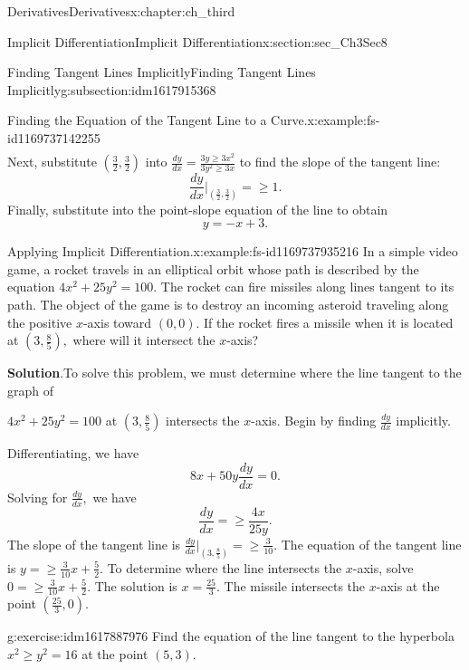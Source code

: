 \documentclass[oneside,10pt,]{book}
\newcommand{\blocktitlefont}{\relax}
\numberwithin{equation}{section}
\begin{document}
\begin{chapterptx}{Derivatives}{}{Derivatives}{}{}{x:chapter:ch_third}
\begin{sectionptx}{Implicit Differentiation}{}{Implicit Differentiation}{}{}{x:section:sec_Ch3Sec8}
\begin{subsectionptx}{Finding Tangent Lines Implicitly}{}{Finding Tangent Lines Implicitly}{}{}{g:subsection:idm1617915368}
\begin{example}{Finding the Equation of the Tangent Line to a Curve.}{x:example:fs-id1169737142255}
\begin{align*}
\end{align*}
Next, substitute \((\frac{3}{2},\frac{3}{2})\) into \(\frac{dy}{dx}=\frac{3y\geq 3x^2}{3y^2\geq 3x}\) to find the slope of the tangent line:%
%
\begin{equation*}
\frac{dy}{dx}|_{(\frac{3}{2},\frac{3}{2})}=\geq 1.
\end{equation*}
Finally, substitute into the point-slope equation of the line to obtain%
%
\begin{equation*}
y=-x+3.
\end{equation*}
\end{example}
\begin{example}{Applying Implicit Differentiation.}{x:example:fs-id1169737935216}%
In a simple video game, a rocket travels in an elliptical orbit whose path is described by the equation \(4x^2+25y^2=100.\) The rocket can fire missiles along lines tangent to its path. The object of the game is to destroy an incoming asteroid traveling along the positive \(x\)-axis toward \((0,0).\) If the rocket fires a missile when it is located at \((3,\frac{8}{5}),\) where will it intersect the \(x\)-axis?%
\par\smallskip%
\noindent\textbf{\blocktitlefont Solution}.\hypertarget{g:solution:idm1617894760}{}\quad{}To solve this problem, we must determine where the line tangent to the graph of%
\par
\(4x^2+25y^2=100\) at \((3,\frac{8}{5})\) intersects the \(x\)-axis. Begin by finding \(\frac{dy}{dx}\) implicitly.%
\par
Differentiating, we have%
%
\begin{equation*}
8x+50y\frac{dy}{dx}=0.
\end{equation*}
Solving for \(\frac{dy}{dx},\) we have%
%
\begin{equation*}
\frac{dy}{dx}=\geq \frac{4x}{25y}.
\end{equation*}
The slope of the tangent line is \(\frac{dy}{dx}|_{(3,\frac{8}{5})}=\geq \frac{3}{10}.\) The equation of the tangent line is \(y=\geq \frac{3}{10}x+\frac{5}{2}.\) To determine where the line intersects the \(x\)-axis, solve \(0=\geq \frac{3}{10}x+\frac{5}{2}.\) The solution is \(x=\frac{25}{3}.\) The missile intersects the \(x\)-axis at the point \((\frac{25}{3},0).\)%
\end{example}
\begin{inlineexercise}{}{g:exercise:idm1617887976}%
Find the equation of the line tangent to the hyperbola \(x^2\geq y^2=16\) at the point \((5,3).\)%
\par\smallskip%

\end{inlineexercise}
\end{subsectionptx}
\end{sectionptx}
\end{chapterptx}
\end{document}

